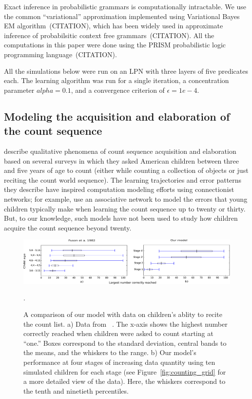 \documentclass[10pt,letterpaper]{article}
\begin{document}
Exact inference in probabilistic grammars is computationally
intractable. We use the common ``variational'' approximation
implemented using Variational Bayes EM algorithm~(CITATION), which has
been widely used in approximate inference of probabilsitic context
free grammars~(CITATION). All the computations in this paper were done
using the PRISM probabilistic logic programming language~(CITATION).

All the simulations below were run on an LPN with three layers of five
predicates each. The learning algorithm was run for a single
iteration, a concentration parameter $alpha=0.1$, and a convergence
criterion of $\epsilon=1e-4$.

\subsection{Modeling the acquisition and elaboration of the count sequence}

\citet{FusRicBriar1982} describe qualitative phenomena of
count sequence acquisition and elaboration based on several surveys in
which they asked American children between three and five years of age
to count (either while counting a collection of objects or just
reciting the count world sequence). The learning trajectories and
error patterns they describe have inspired computation modeling
efforts using connectionist networks; for example,
\citet{ma1989modeling} use an associative network to model the errors
that young children typically make when learning the count sequence up
to twenty or thirty. But, to our knowledge, such models have not been
used to study how children acquire the count sequence beyond twenty.


\begin{figure}[t]
\includegraphics[width=0.9\linewidth]{figures/modelboxplot}
\caption{A comparison of our model with data on children's ablity to
  recite the count list. a) Data from ~\citet{FusRicBriar1982}. The
  x-axis shows the highest number correctly reached when children were
  asked to count starting at ``one.'' Boxes correspond to the standard
  deviation, central bands to the means, and the whiskers to the
  range. b) Our model's performance at four stages of increasing data
  quantity using ten simulated children for each stage (see
  Figure~\ref{fig:counting_grid} for a more detailed view of the
  data). Here, the whiskers correspond to the tenth and ninetieth
  percentiles.
\label{fig:fuson_model_comparison}}. 
\end{figure}
\end{document}
